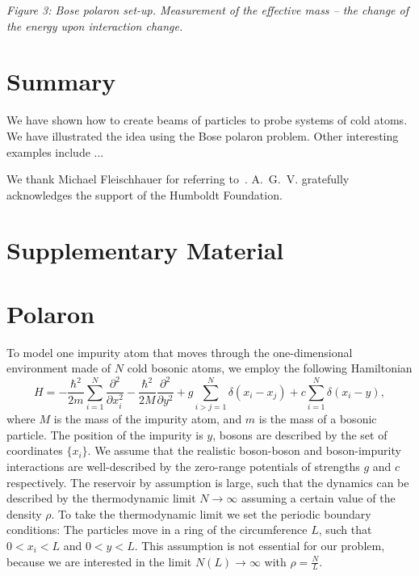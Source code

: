 \documentclass[twocolumn,amsmath,amssymb,showpacs,prl,superscriptaddress,aps]{revtex4-1}
\begin{document}
{\it Figure 3: Bose polaron set-up. Measurement of the effective mass -- the change of the energy upon interaction change.}


\section{Summary} 

We have shown how to create beams of particles to probe systems of cold atoms. We have illustrated the idea using the Bose polaron problem. Other interesting examples include ... 

\begin{acknowledgments}
We thank Michael Fleischhauer for referring to~\cite{paper}.
A.~G.~V. gratefully acknowledges the support of the Humboldt Foundation.
\end{acknowledgments}

\widetext

\section{Supplementary Material}

\section{Polaron}

To model one impurity atom that moves through the one-dimensional environment made of $N$ cold bosonic atoms, we employ the following Hamiltonian
\begin{equation}
H=-\frac{\hbar^2}{2m}\sum_{i=1}^N\frac{\partial^2}{\partial x_i^2}-\frac{\hbar^2}{2M}\frac{\partial^2}{\partial y^2}+g\sum_{i>j=1}^N\delta(x_i-x_j)+c\sum_{i=1}^N \delta(x_i-y),
\end{equation}
where $M$ is the mass of the impurity atom, and $m$ is the mass of a bosonic particle. The position of the impurity is $y$, bosons are described by the set of coordinates $\{x_i\}$. 
We assume that the realistic boson-boson and boson-impurity interactions are well-described by the zero-range potentials of strengths $g$ and $c$ respectively. 
The reservoir by assumption is large, such that the dynamics can be described by the thermodynamic limit $N\to \infty$ assuming a certain value of the density $\rho$.
To take the thermodynamic limit we set the periodic boundary conditions: The particles move in a ring of the circumference $L$, such that $0<x_i<L$ and $0<y<L$.
This assumption is not essential for our problem, because we are interested in the limit $N(L)\to \infty$ with $\rho=\frac{N}{L}$.
\end{document}
